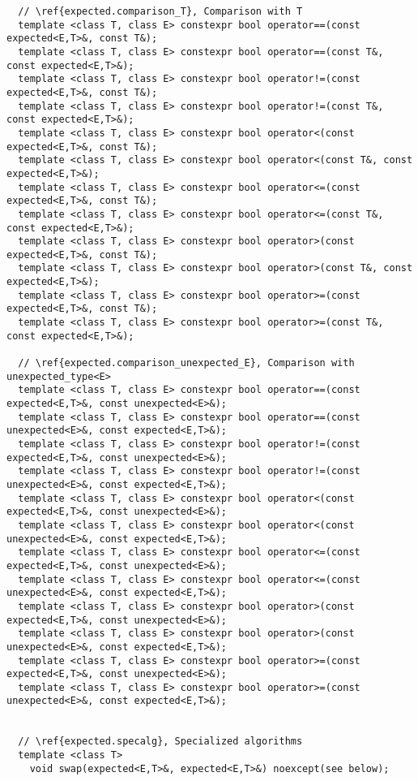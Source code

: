 \documentclass[a4paper,10pt]{article}
\begin{document}
\begin{lstlisting}
  // \ref{expected.comparison_T}, Comparison with T
  template <class T, class E> constexpr bool operator==(const expected<E,T>&, const T&);
  template <class T, class E> constexpr bool operator==(const T&, const expected<E,T>&);
  template <class T, class E> constexpr bool operator!=(const expected<E,T>&, const T&);
  template <class T, class E> constexpr bool operator!=(const T&, const expected<E,T>&);
  template <class T, class E> constexpr bool operator<(const expected<E,T>&, const T&);
  template <class T, class E> constexpr bool operator<(const T&, const expected<E,T>&);
  template <class T, class E> constexpr bool operator<=(const expected<E,T>&, const T&);
  template <class T, class E> constexpr bool operator<=(const T&, const expected<E,T>&);
  template <class T, class E> constexpr bool operator>(const expected<E,T>&, const T&);
  template <class T, class E> constexpr bool operator>(const T&, const expected<E,T>&);
  template <class T, class E> constexpr bool operator>=(const expected<E,T>&, const T&);
  template <class T, class E> constexpr bool operator>=(const T&, const expected<E,T>&);

  // \ref{expected.comparison_unexpected_E}, Comparison with unexpected_type<E>
  template <class T, class E> constexpr bool operator==(const expected<E,T>&, const unexpected<E>&);
  template <class T, class E> constexpr bool operator==(const unexpected<E>&, const expected<E,T>&);
  template <class T, class E> constexpr bool operator!=(const expected<E,T>&, const unexpected<E>&);
  template <class T, class E> constexpr bool operator!=(const unexpected<E>&, const expected<E,T>&);
  template <class T, class E> constexpr bool operator<(const expected<E,T>&, const unexpected<E>&);
  template <class T, class E> constexpr bool operator<(const unexpected<E>&, const expected<E,T>&);
  template <class T, class E> constexpr bool operator<=(const expected<E,T>&, const unexpected<E>&);
  template <class T, class E> constexpr bool operator<=(const unexpected<E>&, const expected<E,T>&);
  template <class T, class E> constexpr bool operator>(const expected<E,T>&, const unexpected<E>&);
  template <class T, class E> constexpr bool operator>(const unexpected<E>&, const expected<E,T>&);
  template <class T, class E> constexpr bool operator>=(const expected<E,T>&, const unexpected<E>&);
  template <class T, class E> constexpr bool operator>=(const unexpected<E>&, const expected<E,T>&);


  // \ref{expected.specalg}, Specialized algorithms
  template <class T> 
    void swap(expected<E,T>&, expected<E,T>&) noexcept(see below);


\end{lstlisting}
\end{document}
